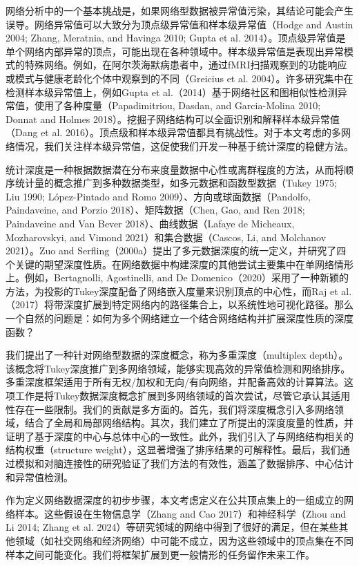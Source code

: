 \documentclass[
  10
]{article}
\begin{document}
网络分析中的一个基本挑战是，如果网络型数据被异常值污染，其结论可能会产生误导。网络异常值可以大致分为顶点级异常值和样本级异常值（Hodge and Austin 2004; Zhang, Meratnia, and Havinga 2010; Gupta et al. 2014）。顶点级异常值是单个网络内部异常的顶点，可能出现在各种领域中。样本级异常值是表现出异常模式的特殊网络。例如，在阿尔茨海默病患者中，通过fMRI扫描观察到的功能响应或模式与健康老龄化个体中观察到的不同（Greicius et al. 2004）。许多研究集中在检测样本级异常值上，例如Gupta et al.（2014）基于网络社区和图相似性检测异常值，使用了各种度量（Papadimitriou, Dasdan, and Garcia-Molina 2010; Donnat and Holmes 2018）。挖掘子网络结构可以全面识别和解释样本级异常值（Dang et al. 2016）。顶点级和样本级异常值都具有挑战性。对于本文考虑的多网络情况，我们关注样本级异常值，这促使我们开发一种基于统计深度的稳健方法。

统计深度是一种根据数据潜在分布来度量数据中心性或离群程度的方法，从而将顺序统计量的概念推广到多种数据类型，如多元数据和函数型数据（Tukey 1975; Liu 1990; López-Pintado and Romo 2009）、方向或球面数据（Pandolfo, Paindaveine, and Porzio 2018）、矩阵数据（Chen, Gao, and Ren 2018; Paindaveine and Van Bever 2018）、曲线数据（Lafaye de Micheaux, Mozharovskyi, and Vimond 2021）和集合数据（Cascos, Li, and Molchanov 2021）。Zuo and Serfling（2000a）提出了多元数据深度的统一定义，并研究了四个关键的期望深度性质。在网络数据中构建深度的其他尝试主要集中在单网络情形上。例如，Bertagnolli, Agostinelli, and De Domenico（2020）采用了一种新颖的方法，为投影的Tukey深度配备了网络嵌入度量来识别顶点的中心性，而Raj et al.（2017）将带深度扩展到特定网络内的路径集合上，以系统性地可视化路径。那么一个自然的问题是：如何为多个网络建立一个结合网络结构并扩展深度性质的深度函数？

我们提出了一种针对网络型数据的深度概念，称为多重深度（multiplex depth）。该概念将Tukey深度推广到多网络领域，能够实现高效的异常值检测和网络排序。多重深度框架适用于所有无权/加权和无向/有向网络，并配备高效的计算算法。这项工作是将Tukey数据深度概念扩展到多网络领域的首次尝试，尽管它承认其适用性存在一些限制。我们的贡献是多方面的。首先，我们将深度概念引入多网络领域，结合了全局和局部网络结构。其次，我们建立了所提出的深度度量的性质，并证明了基于深度的中心与总体中心的一致性。此外，我们引入了与网络结构相关的结构权重（structure weight），这显著增强了排序结果的可解释性。最后，我们通过模拟和对脑连接性的研究验证了我们方法的有效性，涵盖了数据排序、中心估计和异常值检测。

作为定义网络数据深度的初步步骤，本文考虑定义在公共顶点集上的一组成立的网络样本。这些假设在生物信息学（Zhang and Cao 2017）和神经科学（Zhou and Li 2014; Zhang et al. 2024）等研究领域的网络中得到了很好的满足，但在某些其他领域（如社交网络和经济网络）中可能不成立，因为这些领域中的顶点集在不同样本之间可能变化。我们将框架扩展到更一般情形的任务留作未来工作。
\end{document}
